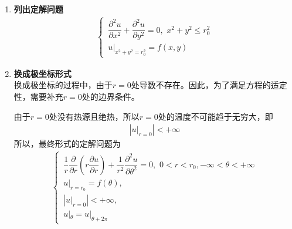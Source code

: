 \begin{enumerate}[\textbf{步骤}1 ]
	\item \textbf{列出定解问题}
	\begin{align}
		\begin{cases}
			\, \dfrac{\partial^2 u}{\partial x^2} + \dfrac{\partial^2 u}{\partial y^2} = 0, \,\, x^2 + y^2 \le r_0^2 \\[0.5em]
			\, u|_{x^2 + y^2 = r_0^2} = f(x,y)
		\end{cases}
	\end{align}
	\item \textbf{换成极坐标形式}\\
	换成极坐标的过程中，由于$r = 0$处导数不存在。因此，为了满足方程的适定性，需要补充$r = 0$处的边界条件。
	
	由于$r = 0$处没有热源且绝热，所以$r=0$处的温度不可能趋于无穷大，即
	\begin{align*}
		\left|u|_{r = 0}\right| < + \infty
	\end{align*}
	所以，最终形式的定解问题为
	\begin{align}
		\begin{cases}
			\, \dfrac{1}{r}\dfrac{\partial}{\partial r}\left(r \dfrac{\partial u}{\partial r}\right)+\dfrac{1}{r^2}\dfrac{\partial^2 u}{\partial \theta^2} =0, \,\, 0<r<r_0, -\infty < \theta < + \infty\\[0.5em]
			\, u|_{r = r_0} = f(\theta),\\
			\, \left|u|_{r = 0}\right| < + \infty,\\
			\, u|_{\theta} = u|_{\theta + 2\pi}
		\end{cases}
	\end{align}


\end{enumerate}
